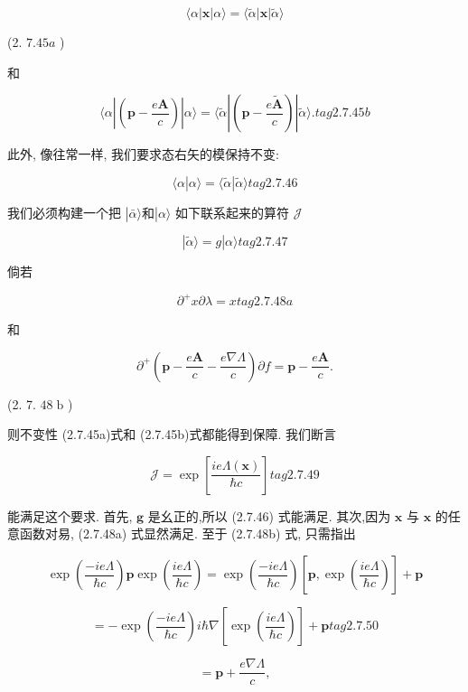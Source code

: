 \documentclass[lang=cn,newtx,10pt,scheme=chinese,thmcnt=section]{elegantbook}
\begin{document}
$$
\langle \alpha \left| \mathbf{x}\right| \alpha \rangle = \langle \widetilde{\alpha }\left| \mathbf{x}\right| \widetilde{\alpha }\rangle
$$

(2. ${7.45a}$ )

和

$$
\langle \alpha \left| \left( {\mathbf{p} - \frac{e\mathbf{A}}{c}}\right) \right| \alpha \rangle = \langle \widetilde{\alpha }\left| \left( {\mathbf{p} - \frac{e\widetilde{\mathbf{A}}}{c}}\right) \right| \widetilde{\alpha }\rangle . tag{2.7.45b}
$$

此外, 像往常一样, 我们要求态右矢的模保持不变:

$$
\langle \alpha | \alpha \rangle = \langle \widetilde{\alpha } | \widetilde{\alpha }\rangle tag{2.7.46}
$$

我们必须构建一个把 $\left| {\bar{\alpha }\rangle \text{和}}\right| \alpha \rangle$ 如下联系起来的算符 $\mathcal{J}$

$$
\left| {\widetilde{\alpha }\rangle = g}\right| \alpha \rangle tag{2.7.47}
$$

倘若

$$
{\partial }^{ + }x\partial \lambda = x tag{2.7.48a}
$$

和

$$
{\partial }^{ + }\left( {\mathbf{p} - \frac{e\mathbf{A}}{c} - \frac{e\nabla \Lambda }{c}}\right) \partial f = \mathbf{p} - \frac{e\mathbf{A}}{c}.
$$

(2. 7. ${48}\mathrm{\;b}$ )

则不变性 (2.7.45a)式和 (2.7.45b)式都能得到保障. 我们断言

$$
\mathcal{J} = \exp \left\lbrack \frac{{ie\Lambda }\left( \mathbf{x}\right) }{\hbar c}\right\rbrack tag{2. 7.49}
$$

能满足这个要求. 首先, $\mathbf{g}$ 是幺正的,所以 (2.7.46) 式能满足. 其次,因为 $\mathbf{x}$ 与 $\mathbf{x}$ 的任意函数对易, (2.7.48a) 式显然满足. 至于 (2.7.48b) 式, 只需指出

$$
\exp \left( \frac{-{ie\Lambda }}{\hbar c}\right) \mathbf{p}\exp \left( \frac{ie\Lambda }{\hbar c}\right) = \exp \left( \frac{-{ie\Lambda }}{\hbar c}\right) \left\lbrack {\mathbf{p},\exp \left( \frac{ie\Lambda }{\hbar c}\right) }\right\rbrack + \mathbf{p}
$$

$$
= - \exp \left( \frac{-{ie\Lambda }}{\hbar c}\right) i\hbar \nabla \left\lbrack {\exp \left( \frac{ie\Lambda }{\hbar c}\right) }\right\rbrack + \mathbf{p} tag{2.7.50}
$$

$$
= \mathbf{p} + \frac{e\nabla \Lambda }{c},
$$
\end{document}
